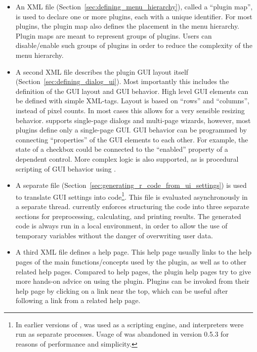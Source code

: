 \documentclass[article,shortnames]{jss}
\begin{document}
\begin{itemize}
    \item
    An XML file (Section~\ref{sec:defining_menu_hierarchy}), 
    called a ``plugin map'', is used to declare one or more plugins, each
    with a unique identifier. For most plugins, the plugin map also defines the
    placement in the menu hierarchy. Plugin maps are meant to represent groups of
    plugins. Users can disable/enable such groups of plugins in order to reduce the
    complexity of the menu hierarchy.

    \item
    A second XML file describes the plugin GUI layout itself (Section~\ref{sec:defining_dialog_ui}). 
    Most importantly this includes
    the definition of the GUI layout and GUI behavior. High level GUI elements can
    be defined with simple XML-tags. Layout is based on ``rows'' and ``columns'',
    instead of pixel counts. In most cases this allows for a very sensible resizing
    behavior.  supports single-page dialogs and multi-page wizards, however,
    most plugins define only a single-page GUI. GUI behavior can be programmed by
    connecting ``properties'' of the GUI elements to each other. For example, the state
    of a checkbox could be connected to the ``enabled'' property of a dependent
    control. More complex logic is also supported, as is procedural scripting of GUI
    behavior using .

    \item
    A separate  file (Section~\ref{sec:generating_r_code_from_ui_settings}) 
    is used to translate GUI settings into 
    code\footnote{
        In earlier versions of ,  was used
        as a scripting engine, and  interpreters were run as separate processes.
        Usage of  was abandoned in  version 0.5.3 for reasons of performance and simplicity.
    }. This  file is evaluated asynchronously in a separate thread. 
    currently enforces structuring the code into three separate sections for
    preprocessing, calculating, and printing results. The generated code is always
    run in a local environment, in order to allow the use of temporary variables
    without the danger of overwriting user data.

    \item
    A third XML file defines a help page. This help page usually links to the  help
    pages of the main functions/concepts used by the plugin, as well as to other
    related  help pages. Compared to  help
    pages, the plugin help pages try to give more hands-on advice on using the
    plugin. Plugins can be invoked from their help page by clicking on a link near
    the top, which can be useful after following a link from a related help page.
\end{itemize}
\end{document}
